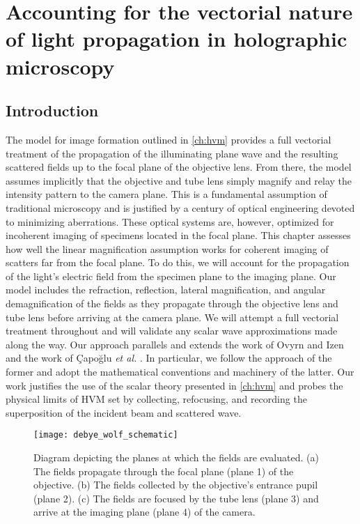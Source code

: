 \chapter{Accounting for the vectorial nature of light propagation in holographic microscopy}
\label{ch:debye}




\section{Introduction}

The model for image formation outlined in \autoref{ch:hvm} provides a full
vectorial treatment of the propagation of the illuminating plane wave and
the resulting scattered fields up to the focal plane of the objective lens.
From there, the model assumes implicitly that the objective and tube lens
simply magnify and relay the intensity pattern to the
camera plane.
This is a fundamental assumption of traditional microscopy and is justified
by a century of optical engineering devoted to minimizing aberrations.
These optical systems are, however, optimized for incoherent imaging of specimens located in the focal plane.
This chapter assesses how well the linear magnification assumption works for
coherent imaging of scatters far from the focal plane. To do this, we will
account for the propagation of the light's electric field from
the specimen plane to the imaging plane. Our model includes the
refraction, reflection, lateral magnification, and angular demagnification
of the fields as they propagate through the objective lens and tube lens
before arriving at the camera plane. We will attempt a full vectorial
treatment throughout and will validate any scalar wave approximations
made along the way. Our approach parallels and extends the work of
Ovyrn and Izen\cite{izen00} and the work of \c{C}apo\u{g}lu \emph{et al.}
\cite{capoglu12}. In particular, we follow the approach of the
former and adopt the mathematical conventions and machinery of the latter.
Our work justifies the use of the scalar theory presented in \autoref{ch:hvm} and
probes the physical limits of HVM set by collecting, refocusing, and recording
the superposition of the incident beam and scattered wave.

\begin{figure}
  \centering
  \texttt{[image: debye\_wolf\_schematic]}
  \caption{Diagram depicting the planes at which the fields are evaluated.
    (a) The fields propagate through the focal plane (plane 1) of the objective.
    (b) The fields collected by the objective's entrance pupil (plane 2).
    (c) The fields are focused by the tube lens (plane 3) and arrive at the
    imaging plane (plane 4) of the camera.}
  \label{fig:debye_schematic}
\end{figure}

